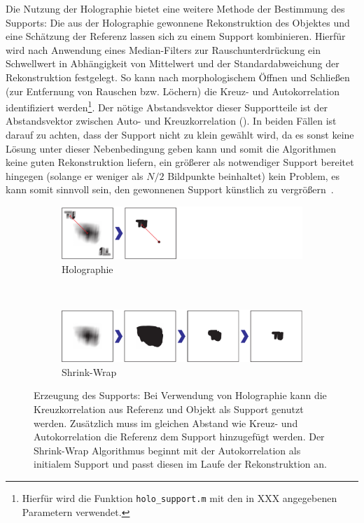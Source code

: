 Die Nutzung der Holographie bietet eine weitere Methode der Bestimmung des Supports: Die aus der Holographie gewonnene Rekonstruktion des Objektes und eine Schätzung der Referenz lassen sich zu einem Support kombinieren. Hierfür wird nach Anwendung eines Median-Filters zur Rauschunterdrückung ein Schwellwert in Abhängigkeit von Mittelwert und der Standardabweichung der Rekonstruktion festgelegt. So kann nach morphologischem Öffnen und Schließen (zur Entfernung von Rauschen bzw. Löchern) die Kreuz- und Autokorrelation identifiziert werden\footnote{Hierfür wird die Funktion \texttt{holo\_support.m} mit den in XXX angegebenen Parametern verwendet.}. Der nötige Abstandsvektor dieser Supportteile ist der Abstandsvektor zwischen Auto- und Kreuzkorrelation ().
In beiden Fällen ist darauf zu achten, dass der Support nicht zu klein gewählt wird, da es sonst keine Lösung unter dieser Nebenbedingung geben kann und somit die Algorithmen keine guten Rekonstruktion liefern, ein größerer als notwendiger Support bereitet hingegen (solange er weniger als $N/2$ Bildpunkte beinhaltet) kein Problem, es kann somit sinnvoll sein, den gewonnenen Support künstlich zu vergrößern~\cite{huang2010}.

\begin{figure}
	\centering
	\begin{subfigure}[b]{0.9\textwidth}
		\includegraphics[width=\textwidth]{images/support_holo.pdf}
		\caption{Holographie}
	\end{subfigure}\\

	\begin{subfigure}[b]{0.9\textwidth}
		\includegraphics[width=\textwidth]{images/support_sw.pdf}
		\caption{Shrink-Wrap}	
	\end{subfigure}
	
	\caption[Supportgenerierung]{Erzeugung des Supports: Bei Verwendung von Holographie kann die Kreuzkorrelation aus Referenz und Objekt als Support genutzt werden. Zusätzlich muss im gleichen Abstand wie Kreuz- und Autokorrelation die Referenz dem Support hinzugefügt werden. Der Shrink-Wrap Algorithmus beginnt mit der Autokorrelation als initialem Support und passt diesen im Laufe der Rekonstruktion an.}
	\label{fig:support}
\end{figure} 

